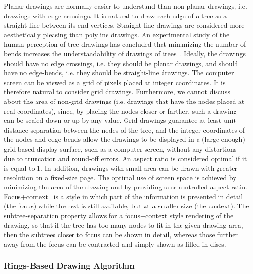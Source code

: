 \documentclass[10pt,psfig]{article}
\begin{document}
{Planar drawings are normally easier to understand than non-planar
drawings, i.e. drawings with edge-crossings. It is natural to draw
each edge of a tree as a straight line between its end-vertices.
Straight-line drawings are considered more aesthetically pleasing
than polyline drawings. An experimental study of the human
perception of tree drawings has concluded that minimizing the
number of bends increases the understandability of drawings of
trees~\cite{p-97, pcj-97, tdb-88}. Ideally, the
drawings should have no edge crossings, i.e. they should be planar
drawings, and should have no edge-bends, i.e. they should be
straight-line drawings. The computer screen can be viewed as a
grid of pixels placed at integer coordinates. It is therefore
natural to consider grid drawings. Furthermore, we cannot discuss
about the area of non-grid drawings (i.e. drawings that have the
nodes placed at real coordinates), since, by placing the nodes
closer or farther,  such a drawing can be scaled down or up by any
value. Grid drawings guarantee at least unit distance separation
between the nodes of the tree, and the integer coordinates of the
nodes and edge-bends allow the drawings to be displayed in a
(large-enough) grid-based display surface, such as a computer
screen, without any distortions due to truncation and round-off
errors.
An aspect ratio is considered optimal if it is equal to 1.
In addition, drawings with
small area can be drawn  with greater resolution on a fixed-size
page. The optimal use of screen space is achieved by minimizing
the area of the drawing and by providing user-controlled aspect
ratio.
Focus+context~\cite{sb-94} is a style in which part of the
information is presented in detail (the focus) while the rest is
still available, but at a smaller size (the context). The
subtree-separation property allows for a focus+context style
rendering of the drawing, so that if the tree has too many nodes
to fit in the given drawing area, then the subtrees closer to
focus can be shown in detail, whereas those further away from the
focus can be contracted and simply shown as filled-in discs.

\subsubsection{Rings-Based Drawing Algorithm}
\label{se:rings}

}
\end{document}

